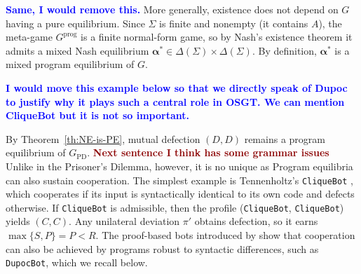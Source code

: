\documentclass[twoside,11pt]{article}
\newcommand{\boldred}[1]{\textbf{\textcolor{darkred}{#1}}}
\newcommand{\boldblue}[1]{\textbf{\textcolor{blue}{#1}}}
\begin{document}
\boldblue{Same, I would remove this.} More generally, existence does not depend on $G$ having a pure equilibrium. Since $\Sigma$ is finite and nonempty (it contains $A$), the meta-game $G^{\mathrm{prog}}$ is a finite normal-form game, so by Nash's existence theorem \citep{nash1950equilibrium, nash1951} it admits a mixed Nash equilibrium $\bm{\alpha}^* \in \Delta(\Sigma) \times \Delta(\Sigma)$. By definition, $\bm{\alpha}^*$ is a mixed program equilibrium of $G$.

\boldblue{I would move this example below so that we directly speak of Dupoc to justify why it plays such a central role in OSGT. We can mention CliqueBot but it is not so important.}
\begin{example}
  By Theorem~\ref{th:NE-is-PE}, mutual defection $(D,D)$ remains a program equilibrium of $G_{\mathrm{PD}}$. \boldred{Next sentence I think has some grammar issues} Unlike in the Prisoner's Dilemma, however, it is no unique as Program equilibria can also sustain cooperation. The simplest example is Tennenholtz's \texttt{CliqueBot} \citep{tennenholtz2004program}, which cooperates if its input is syntactically identical to its own code and defects otherwise. If \texttt{CliqueBot} is admissible, then the profile (\texttt{CliqueBot}, \texttt{CliqueBot}) yields $(C,C)$. Any unilateral deviation $\pi'$ obtains defection, so it earns $\max\{S,P\} = P < R$. The proof-based bots introduced by \cite{Critch} show that cooperation can also be achieved by programs robust to syntactic differences, such as \texttt{DupocBot}, which we recall below.
\end{example}
\end{document}
